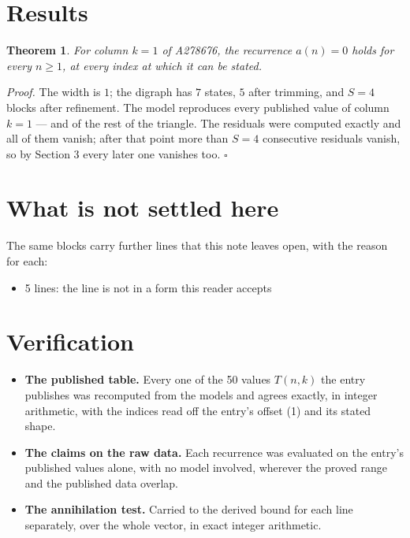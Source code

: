 \documentclass[11pt]{article}
\newtheorem{theorem}{Theorem}
\theoremstyle{definition}
\begin{document}
\section{Results}

\begin{theorem} For column $k = 1$ of A278676, the recurrence $a(n) = 0$ holds for every $n \ge 1$, at every index at which it can be stated.\end{theorem}

{\itshape Proof.} The width is $1$; the digraph has $7$ states, $5$ after trimming, and $S = 4$ blocks after refinement. The model reproduces every published value of column $k = 1$ --- and of the rest of the triangle. The residuals were computed exactly and all of them vanish; after that point more than $S = 4$ consecutive residuals vanish, so by Section 3 every later one vanishes too. $\square$

\section{What is not settled here}

The same blocks carry further lines that this note leaves open, with the reason for each:

\begin{itemize}

\item 5 lines: the line is not in a form this reader accepts

\end{itemize}

\section{Verification}

\begin{itemize}

\item {\bfseries The published table.} Every one of the 50 values $T(n,k)$ the entry publishes was recomputed from the models and agrees exactly, in integer arithmetic, with the indices read off the entry's offset (1) and its stated shape.

\item {\bfseries The claims on the raw data.} Each recurrence was evaluated on the entry's published values alone, with no model involved, wherever the proved range and the published data overlap.

\item {\bfseries The annihilation test.} Carried to the derived bound for each line separately, over the whole vector, in exact integer arithmetic.

\end{itemize}
\end{document}
